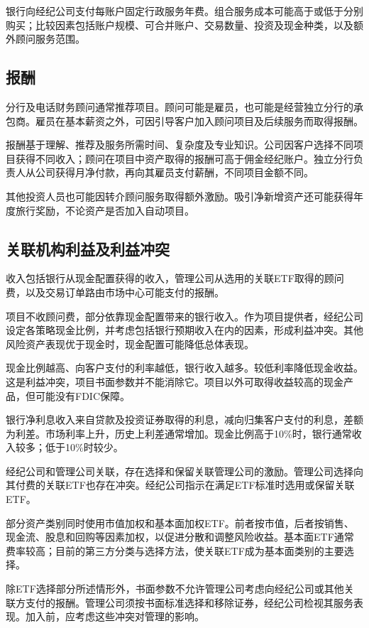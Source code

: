 \documentclass[UTF8,fontset=none,11pt,a4paper]{ctexart}
\begin{document}
银行向经纪公司支付每账户固定行政服务年费。组合服务成本可能高于或低于分别购买；比较因素包括账户规模、可合并账户、交易数量、投资及现金种类，以及额外顾问服务范围。


\subsection*{报酬}
分行及电话财务顾问通常推荐项目。顾问可能是雇员，也可能是经营独立分行的承包商。雇员在基本薪资之外，可因引导客户加入顾问项目及后续服务而取得报酬。


报酬基于理解、推荐及服务所需时间、复杂度及专业知识。公司因客户选择不同项目获得不同收入；顾问在项目中资产取得的报酬可高于佣金经纪账户。独立分行负责人从公司获得月净付款，再向其雇员支付薪酬，不同项目金额不同。


其他投资人员也可能因转介顾问服务取得额外激励。吸引净新增资产还可能获得年度旅行奖励，不论资产是否加入自动项目。


\subsection*{关联机构利益及利益冲突}
收入包括银行从现金配置获得的收入，管理公司从选用的关联ETF取得的顾问费，以及交易订单路由市场中心可能支付的报酬。


项目不收顾问费，部分依靠现金配置带来的银行收入。作为项目提供者，经纪公司设定各策略现金比例，并考虑包括银行预期收入在内的因素，形成利益冲突。其他风险资产表现优于现金时，现金配置可能降低总体表现。


现金比例越高、向客户支付的利率越低，银行收入越多。较低利率降低现金收益。这是利益冲突，项目书面参数并不能消除它。项目以外可取得收益较高的现金产品，但可能没有FDIC保障。


银行净利息收入来自贷款及投资证券取得的利息，减向归集客户支付的利息，差额为利差。市场利率上升，历史上利差通常增加。现金比例高于10\%时，银行通常收入较多；低于10\%时较少。


经纪公司和管理公司关联，存在选择和保留关联管理公司的激励。管理公司选择向其付费的关联ETF也存在冲突。经纪公司指示在满足ETF标准时选用或保留关联ETF。


部分资产类别同时使用市值加权和基本面加权ETF。前者按市值，后者按销售、现金流、股息和回购等因素加权，以促进分散和调整风险收益。基本面ETF通常费率较高；目前的第三方分类与选择方法，使关联ETF成为基本面类别的主要选择。


除ETF选择部分所述情形外，书面参数不允许管理公司考虑向经纪公司或其他关联方支付的报酬。管理公司须按书面标准选择和移除证券，经纪公司检视其服务表现。加入前，应考虑这些冲突对管理的影响。
\end{document}
